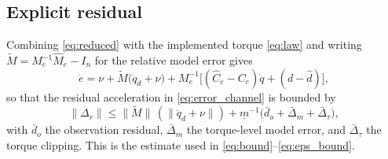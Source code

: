 \subsection{Explicit residual}
Combining \eqref{eq:reduced} with the implemented torque \eqref{eq:law} and
writing $\tilde M=M_e^{-1}\hat M_e-I_n$ for the relative model error gives
\begin{equation}
 \ddot e=\nu+\tilde M\bigl(\ddot q_d+\nu\bigr)
 +M_e^{-1}\bigl[(\hat C_e-C_e)\dot q+(d-\hat d)\bigr],
\end{equation}
so that the residual acceleration in \eqref{eq:error_channel} is bounded by
\begin{equation}
 \|\Delta_r\|\le\|\tilde M\|\,(\|\ddot q_d+\nu\|)
 +\underline m^{-1}\bigl(\bar d_o+\bar\Delta_m+\bar\Delta_\tau\bigr),
\end{equation}
with $\bar d_o$ the observation residual, $\bar\Delta_m$ the torque-level model
error, and $\bar\Delta_\tau$ the torque clipping. This is the estimate used in
\eqref{eq:bound}--\eqref{eq:eps_bound}.
